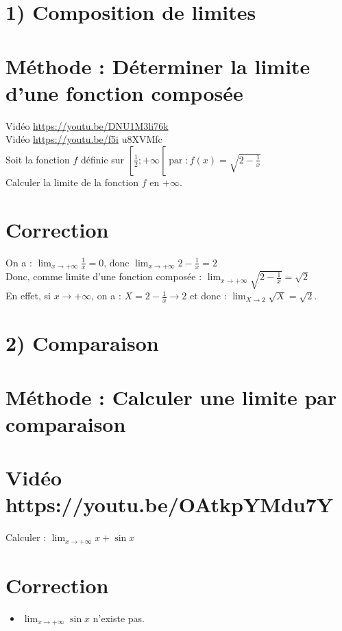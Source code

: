 \documentclass[10pt]{article}
\begin{document}
\section*{1) Composition de limites}
\section*{Méthode : Déterminer la limite d'une fonction composée}
Vidéo \href{https://youtu.be/DNU1M3li76k}{https://youtu.be/DNU1M3li76k}\\
Vidéo \href{https://youtu.be/f5i}{https://youtu.be/f5i} u8XVMfc\\
Soit la fonction $f$ définie sur $\left[\frac{1}{2} ;+\infty\left[\operatorname{par}: f(x)=\sqrt{2-\frac{1}{x}}\right.\right.$\\
Calculer la limite de la fonction $f$ en $+\infty$.

\section*{Correction}
On a : $\lim _{x \rightarrow+\infty} \frac{1}{x}=0$, donc $\lim _{x \rightarrow+\infty} 2-\frac{1}{x}=2$\\
Donc, comme limite d'une fonction composée : $\lim _{x \rightarrow+\infty} \sqrt{2-\frac{1}{x}}=\sqrt{2}$\\
En effet, si $x \rightarrow+\infty$, on a : $X=2-\frac{1}{x} \rightarrow 2$ et donc : $\lim _{X \rightarrow 2} \sqrt{X}=\sqrt{2}$.

\section*{2) Comparaison}
\section*{Méthode : Calculer une limite par comparaison}
\section*{Vidéo https://youtu.be/OAtkpYMdu7Y}
Calculer : $\lim _{x \rightarrow+\infty} x+\sin x$

\section*{Correction}
\begin{itemize}
  \item $\lim _{x \rightarrow+\infty} \sin x$ n'existe pas.
\end{itemize}
\end{document}
